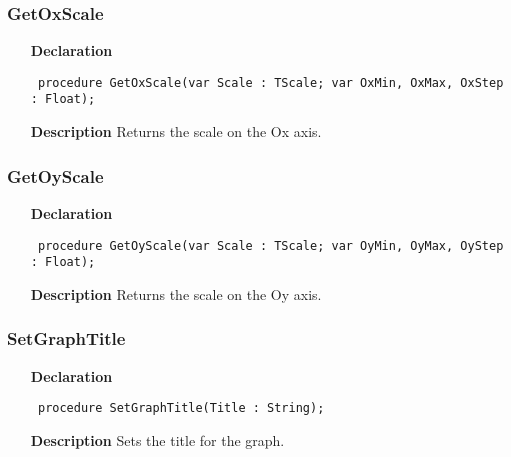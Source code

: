 \documentclass[12pt,a4paper,oneside]{report}
\newcommand{\declarationitem}[1]{\textbf{#1}}
\newcommand{\descriptiontitle}[1]{\textbf{#1}}
\newcommand{\code}[1]{\texttt{#1}}
\begin{document}
\subsubsection{GetOxScale}
\label{uwinplot-GetOxScale}
\begin{itemize}\item[\declarationitem{Declaration}\hfill]
	\begin{flushleft}
		\code{
			procedure GetOxScale(var Scale : TScale; var OxMin, OxMax, OxStep : Float);}
		
	\end{flushleft}
	
	\par
	\item[\descriptiontitle{Description}]
	Returns the scale on the Ox axis.
	
\end{itemize}
\subsubsection{GetOyScale}
\label{uwinplot-GetOyScale}
\begin{itemize}\item[\declarationitem{Declaration}\hfill]
	\begin{flushleft}
		\code{
			procedure GetOyScale(var Scale : TScale; var OyMin, OyMax, OyStep : Float);}
		
	\end{flushleft}
	
	\par
	\item[\descriptiontitle{Description}]
	Returns the scale on the Oy axis.
	
\end{itemize}
\subsubsection{SetGraphTitle}
\label{uwinplot-SetGraphTitle}
\begin{itemize}\item[\declarationitem{Declaration}\hfill]
	\begin{flushleft}
		\code{
			procedure SetGraphTitle(Title : String);}
		
	\end{flushleft}
	
	\par
	\item[\descriptiontitle{Description}]
	Sets the title for the graph.
	
\end{itemize}
\end{document}
